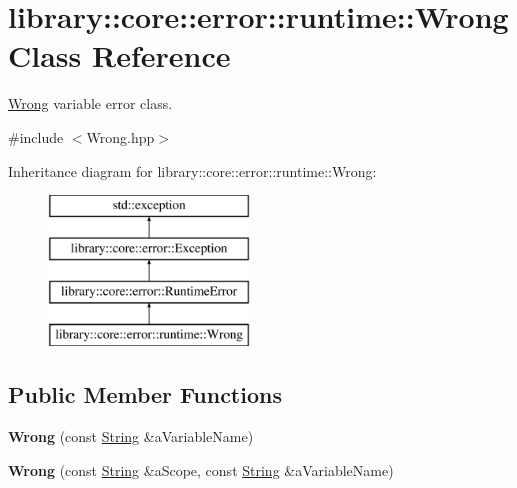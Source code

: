 \hypertarget{classlibrary_1_1core_1_1error_1_1runtime_1_1_wrong}{}\section{library\+:\+:core\+:\+:error\+:\+:runtime\+:\+:Wrong Class Reference}
\label{classlibrary_1_1core_1_1error_1_1runtime_1_1_wrong}


\hyperlink{classlibrary_1_1core_1_1error_1_1runtime_1_1_wrong}{Wrong} variable error class.  




{\ttfamily \#include $<$Wrong.\+hpp$>$}

Inheritance diagram for library\+:\+:core\+:\+:error\+:\+:runtime\+:\+:Wrong\+:\begin{figure}[H]
\begin{center}
\leavevmode
\includegraphics[height=4.000000cm]{classlibrary_1_1core_1_1error_1_1runtime_1_1_wrong}
\end{center}
\end{figure}
\subsection*{Public Member Functions}
\begin{DoxyCompactItemize}
\item 
\mbox{\label{classlibrary_1_1core_1_1error_1_1runtime_1_1_wrong_acb341a0822b64bfa2d8cdf7963b24f96}} 
{\bfseries Wrong} (const \hyperlink{classlibrary_1_1core_1_1types_1_1_string}{String} \&a\+Variable\+Name)
\item 
\mbox{\label{classlibrary_1_1core_1_1error_1_1runtime_1_1_wrong_a413ec4868a4a3283cc0a1dcd2882ad1e}} 
{\bfseries Wrong} (const \hyperlink{classlibrary_1_1core_1_1types_1_1_string}{String} \&a\+Scope, const \hyperlink{classlibrary_1_1core_1_1types_1_1_string}{String} \&a\+Variable\+Name)
\end{DoxyCompactItemize}


